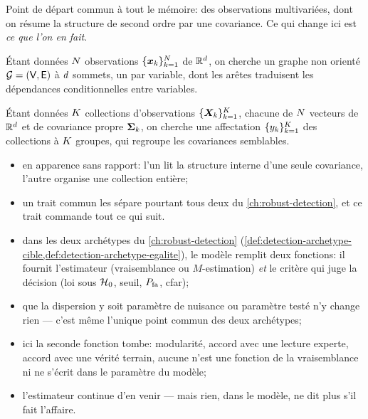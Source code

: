 Point de départ commun à tout le mémoire: des observations multivariées, dont
on résume la structure de second ordre par une covariance. Ce qui change ici
est \emph{ce que l'on en fait}.

\begin{definition}
\label{def:learning-tache-graphe}
  Étant données $N$ observations $\{\boldsymbol{x}_k\}_{k=1}^{N}$ de
  $\mathbb{R}^{d}$, on cherche un graphe non orienté
  $\mathcal{G}=(\mathsf{V},\mathsf{E})$ à $d$ sommets, un par variable, dont les
  arêtes traduisent les dépendances conditionnelles entre variables.
\end{definition}

\begin{definition}
\label{def:learning-tache-partition}
  Étant données $K$ collections d'observations
  $\{\boldsymbol{X}_k\}_{k=1}^{K}$, chacune de $N$ vecteurs de
  $\mathbb{R}^{d}$ et de covariance propre $\boldsymbol{\Sigma}_k$, on cherche une
  affectation $\{y_k\}_{k=1}^{K}$ des collections à
  $K$ groupes, qui regroupe les covariances semblables.
\end{definition}

\begin{itemize}
  \item en apparence sans rapport: l'un lit la structure interne d'une seule
    covariance, l'autre organise une collection entière;
  \item un trait commun les sépare pourtant tous deux du
    \cref{ch:robust-detection}, et ce trait commande tout ce qui suit.
\end{itemize}

\begin{remark}
\label{rem:learning-critere}
  \begin{itemize}
    \item dans les deux archétypes du \cref{ch:robust-detection}
      (\cref{def:detection-archetype-cible,def:detection-archetype-egalite}), le
      modèle remplit deux fonctions: il fournit l'estimateur (vraisemblance ou
      $M$-estimation) \emph{et} le critère qui juge la décision (loi sous
      $\mathcal{H}_0$, seuil, $P_{\mathrm{fa}}$, cfar);
    \item que la dispersion y soit paramètre de nuisance ou paramètre testé n'y
      change rien --- c'est même l'unique point commun des deux archétypes;
    \item ici la seconde fonction tombe: modularité, accord avec une lecture
      experte, accord avec une vérité terrain, aucune n'est une fonction de la
      vraisemblance ni ne s'écrit dans le paramètre du modèle;
    \item l'estimateur continue d'en venir --- mais rien, dans le modèle, ne
      dit plus s'il fait l'affaire.
  \end{itemize}
  \leavevmode
\end{remark}

